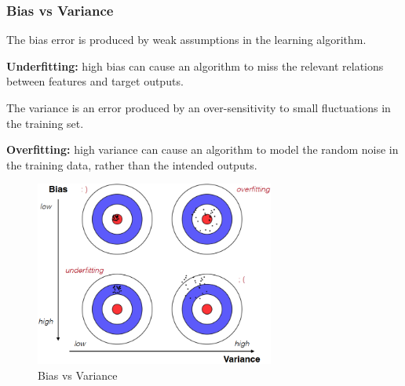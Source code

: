 \subsubsection{Bias vs Variance}
\begin{multicols}{2}
    \begin{flushleft}
        The bias error is produced by weak assumptions in the learning algorithm. 
    \end{flushleft}
    \begin{mdframed}
        \textbf{Underfitting:} high bias can cause an algorithm to miss the relevant relations between features and target outputs.
    \end{mdframed}
    \columnbreak
    The variance is an error produced by an over-sensitivity to small fluctuations in the training set.
    \begin{mdframed}
        \textbf{Overfitting:} high variance can cause an algorithm to model the random noise in the training data, rather than the intended outputs.
    \end{mdframed}
\end{multicols}
\begin{figure}[h]
    \centering
    \includegraphics[width=0.7\textwidth]{images/Bias.png}
    \caption{Bias vs Variance}
\end{figure}
\newpage